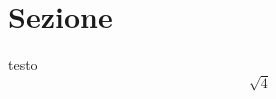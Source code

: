 \documentclass[11pt]{article}
\begin{document}
    \section{Sezione}
    testo
    \[\sqrt{4}\]
\end{document}
